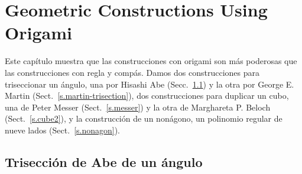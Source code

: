 
\chapter{Geometric Constructions Using Origami}\label{c.origami-constructions}


Este capítulo muestra que las construcciones con origami son más poderosas que las construcciones con regla y compás. Damos dos construcciones para triseccionar un ángulo, una por Hisashi Abe (Secc.~\ref{s.abe-trisection}) y la otra por George E. Martin (Sect.~\ref{s.martin-trisection}), dos construcciones para duplicar un cubo, una de Peter Messer (Sect.~\ref{s.messer}) y la otra de Marghareta P. Beloch (Sect.~\ref{s.cube2}), y la construcción de un nonágono, un polinomio regular de nueve lados (Sect.~\ref{s.nonagon}).

\section{Trisección de Abe de un ángulo}\label{s.abe-trisection}

